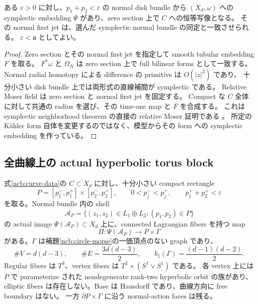 \begin{lemma}\label{ncb:embedding}
ある $\varepsilon>0$ に対し、$p_1+p_2<\varepsilon$ の normal disk bundle から
$(X_d,\omega)$ への symplectic embedding $\Psi$ があり、zero section 上で $C$ への恒等写像となる。
その normal first jet は、選んだ symplectic normal bundle の同定と一致させられる。
$\varepsilon<\mathfrak a$ としてよい。
\end{lemma}

\begin{proof}
Zero section とその normal first jet を指定して smooth tubular embedding $F$ を取る。
$F^*\omega$ と $\Omega_N$ は zero section 上で full bilinear forms として一致する。
Normal radial homotopy による difference の primitive は $O(|z|^2)$ であり、
十分小さい disk bundle 上では両形式の直線補間が symplectic である。
Relative Moser field は zero section と normal first jet を固定する。
Compact な $C$ 全体に対して共通の radius を選び、その time-one map と $F$ を合成する。
これは symplectic neighborhood theorem の直接の relative Moser 証明である
\cite[Section 7.3, Theorem 7.4]{cds-local}。
所定の K\"ahler form 自体を変更するのではなく、模型からその form への symplectic embedding を作っている。
\end{proof}

\subsection{全曲線上の actual hyperbolic torus block}

\begin{theorem}\label{ncb:actual-block}
式\eqref{ncb:curve-data}の $C\subset X_d$ に対し、十分小さい compact rectangle
\[
 P=[p_1^-,p_1^+]\times[p_2^-,p_2^+],
 \qquad 0<p_j^-<p_j^+,\qquad p_1^++p_2^+<\varepsilon
\]
を取る。Normal bundle 内の shell
\[
 \mathcal A_P=\{(z_1,z_2)\in L_1\oplus L_2:(p_1,p_2)\in P\}
\]
の actual image $\Psi(\mathcal A_P)\subset X_d$ 上に、connected Lagrangian fibers を持つ map
\begin{equation}\label{ncb:fibration}
 \Pi:\Psi(\mathcal A_P)\longrightarrow P\times\Gamma
\end{equation}
がある。$\Gamma$ は補題\ref{ncb:circle-morse}の一価頂点のない graph であり、
\begin{equation}\label{ncb:d-counts}
 \#V=d(d-3),\qquad
 \#E=\frac{3d(d-3)}2,\qquad
 b_1(\Gamma)=\frac{(d-1)(d-2)}2.
\end{equation}
Regular fibers は $T^3$、vertex fibers は $T^2\times(S^1\vee S^1)$ である。
各 vertex 上には $P$ で parameterize された nondegenerate rank-two hyperbolic orbit の族があり、
elliptic fibers は存在しない。Base は Hausdorff であり、曲線方向に free boundary はない。
一方 $\partial P\times\Gamma$ に沿う normal-action faces は残る。
\end{theorem}

